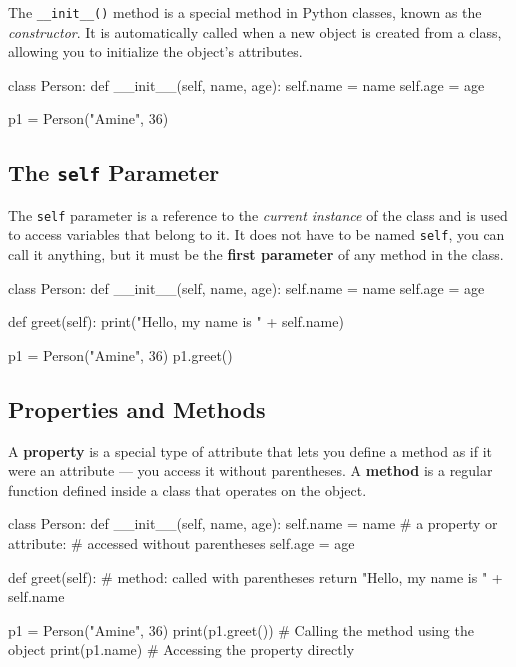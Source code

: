 \documentclass[11pt, a4paper]{article}
\begin{document}
The \texttt{\_\_init\_\_()} method is a special method in Python classes, known as the \emph{constructor}. 
It is automatically called when a new object is created from a class, allowing you to initialize the object's attributes.

\begin{pycode}
class Person:
    def __init__(self, name, age):
        self.name = name
        self.age = age

p1 = Person("Amine", 36)
\end{pycode}

\subsection{The \texttt{self} Parameter}

The \texttt{self} parameter is a reference to the \emph{current instance} of the class and is used to access variables that belong to it. 
It does not have to be named \texttt{self}, you can call it anything, but it must be the \textbf{first parameter} of any method in the class.

\begin{pycode}
class Person:
    def __init__(self, name, age):
        self.name = name
        self.age = age

    def greet(self):
        print("Hello, my name is " + self.name)

p1 = Person("Amine", 36)
p1.greet()
\end{pycode}

\subsection{Properties and Methods}

A \textbf{property} is a special type of attribute that lets you define a method as if it were an attribute — you access it without parentheses. 
A \textbf{method} is a regular function defined inside a class that operates on the object.

\begin{pycode}
class Person:
    def __init__(self, name, age):
        self.name = name       # a property or attribute: 
                               # accessed without parentheses
        self.age = age

    def greet(self):           # method: called with parentheses
        return "Hello, my name is " + self.name

p1 = Person("Amine", 36)
print(p1.greet())  # Calling the method using the object
print(p1.name)     # Accessing the property directly
\end{pycode}
\end{document}
